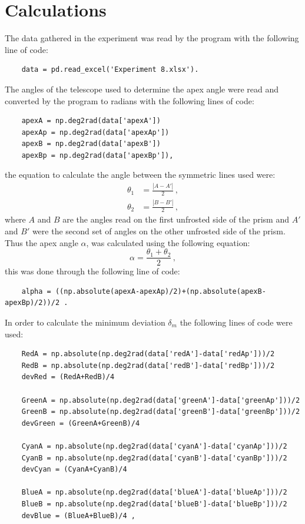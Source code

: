 \documentclass[12pt, a4paper]{article}
\begin{document}
\section*{Calculations}
The data gathered in the experiment was read by the program with the following line of code:
\begin{verbatim}
    data = pd.read_excel('Experiment 8.xlsx').
\end{verbatim}
The angles of the telescope used to determine the apex angle were read and converted by the program to radians with the following lines of code:
\begin{verbatim}
    apexA = np.deg2rad(data['apexA'])
    apexAp = np.deg2rad(data['apexAp'])
    apexB = np.deg2rad(data['apexB'])
    apexBp = np.deg2rad(data['apexBp']),
\end{verbatim}
the equation to calculate the angle between the symmetric lines used were:
\begin{align*}
    \theta_1&=\frac{|A-A'|}{2}\,,\\
    \theta_2&=\frac{|B-B'|}{2}\,,
\end{align*}
where $A$ and $B$ are the angles read on the first unfrosted side of the prism and $A'$ and $B'$ were the second set of angles on the other unfrosted side of the prism. Thus the apex angle $\alpha$, was calculated using the following equation:
\begin{equation*}
    \alpha = \frac{\theta_1+\theta_2}{2}\,,
\end{equation*}
this was done through the following line of code:
\begin{verbatim}
    alpha = ((np.absolute(apexA-apexAp)/2)+(np.absolute(apexB-apexBp)/2))/2 .
\end{verbatim}
In order to calculate the minimum deviation $\delta_m$ the following lines of code were used:
\begin{verbatim}
    RedA = np.absolute(np.deg2rad(data['redA']-data['redAp']))/2
    RedB = np.absolute(np.deg2rad(data['redB']-data['redBp']))/2
    devRed = (RedA+RedB)/4

    GreenA = np.absolute(np.deg2rad(data['greenA']-data['greenAp']))/2
    GreenB = np.absolute(np.deg2rad(data['greenB']-data['greenBp']))/2
    devGreen = (GreenA+GreenB)/4

    CyanA = np.absolute(np.deg2rad(data['cyanA']-data['cyanAp']))/2
    CyanB = np.absolute(np.deg2rad(data['cyanB']-data['cyanBp']))/2
    devCyan = (CyanA+CyanB)/4

    BlueA = np.absolute(np.deg2rad(data['blueA']-data['blueAp']))/2
    BlueB = np.absolute(np.deg2rad(data['blueB']-data['blueBp']))/2
    devBlue = (BlueA+BlueB)/4 ,
\end{verbatim}
\end{document}
